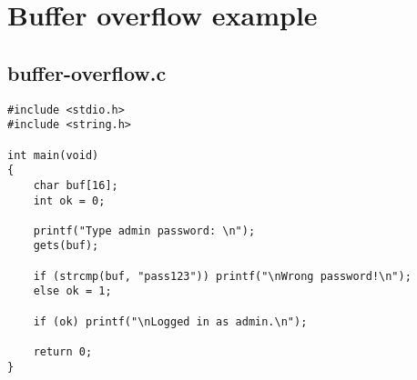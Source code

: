 \documentclass[a4paper]{article}
\begin{document}
\appendix
\section{Buffer overflow example}

\subsection{buffer-overflow.c}
\begin{verbatim}
#include <stdio.h>
#include <string.h>

int main(void)
{
	char buf[16];
	int ok = 0;

	printf("Type admin password: \n");
	gets(buf);

	if (strcmp(buf, "pass123")) printf("\nWrong password!\n");
	else ok = 1;

	if (ok) printf("\nLogged in as admin.\n");

	return 0;
}
\end{verbatim}
\end{document}
